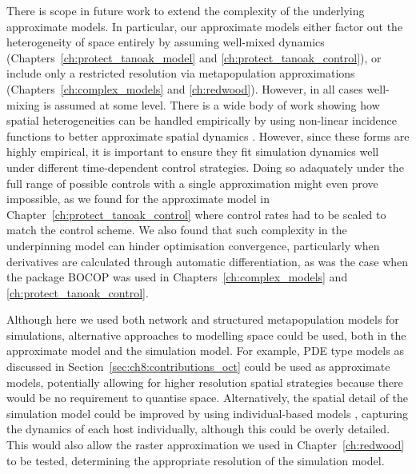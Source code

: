There is scope in future work to extend the complexity of the underlying approximate models. In particular, our approximate models either factor out the heterogeneity of space entirely by assuming well-mixed dynamics (Chapters~\ref{ch:protect_tanoak_model} and \ref{ch:protect_tanoak_control}), or include only a restricted resolution via metapopulation approximations (Chapters~\ref{ch:complex_models} and \ref{ch:redwood}). However, in all cases well-mixing is assumed at some level. There is a wide body of work showing how spatial heterogeneities can be handled empirically by using non-linear incidence functions to better approximate spatial dynamics \citep[e.g.][]{liu_influence_1986, clarke_approximating_2013, chowell_mathematical_2016,chowell_using_2016}. However, since these forms are highly empirical, it is important to ensure they fit simulation dynamics well under different time-dependent control strategies. Doing so adaquately under the full range of possible controls with a single approximation might even prove impossible, as we found for the approximate model in Chapter~\ref{ch:protect_tanoak_control} where control rates had to be scaled to match the control scheme. We also found that such complexity in the underpinning model can hinder optimisation convergence, particularly when derivatives are calculated through automatic differentiation, as was the case when the package BOCOP was used in Chapters~\ref{ch:complex_models} and \ref{ch:protect_tanoak_control}.

Although here we used both network and structured metapopulation models for simulations, alternative approaches to modelling space could be used, both in the approximate model and the simulation model. For example, PDE type models as discussed in Section~\ref{sec:ch8:contributions_oct} \citep[e.g.][]{white_role_2006,neilan_optimal_2011,miyaoka_optimal_2019} could be used as approximate models, potentially allowing for higher resolution spatial strategies because there would be no requirement to quantise space. Alternatively, the spatial detail of the simulation model could be improved by using individual-based models \citep[e.g.][]{cook_constructing_2008,cunniffe_optimising_2015}, capturing the dynamics of each host individually, although this could be overly detailed. This would also allow the raster approximation we used in Chapter~\ref{ch:redwood} to be tested, determining the appropriate resolution of the simulation model.

